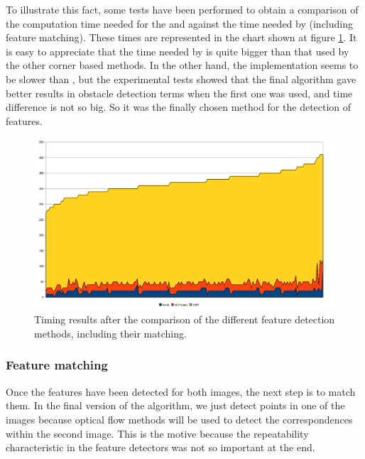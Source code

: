 To illustrate this fact, some tests have been performed to obtain a comparison of the computation time needed for the \cite{harris1988combined} and \cite{shi1994good} against the time needed by \cite{bay2008speeded} (including feature matching). These times are represented in the chart shown at figure \ref{fig:cp01_features_time_comparison}. It is easy to appreciate that the time needed by \cite{bay2008speeded} is quite bigger than that used by the other corner based methods. In the other hand, the \cite{shi1994good} implementation seems to be slower than \cite{harris1988combined}, but the experimental tests showed that the final algorithm gave better results in obstacle detection terms when the first one was used, and time difference is not so big. So it was the finally chosen method for the detection of features.

\begin{figure}[h!]
\centering
\includegraphics{featuresTimeComparison}
\caption{Timing results after the comparison of the different feature detection methods, including their matching.}\label{fig:cp01_features_time_comparison}
\end{figure}

\subsubsection{Feature matching}\label{ch:chapter01_01_02_02}

Once the features have been detected for both images, the next step is to match them. In the final version of the algorithm, we just detect points in one of the images because optical flow methods will be used to detect the correspondences within the second image. This is the motive because the repeatability characteristic in the feature detectors was not so important at the end.

